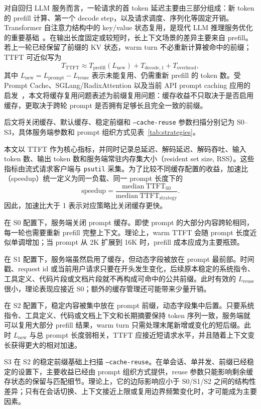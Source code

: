 \documentclass[10pt]{article}
\begin{document}
对自回归 LLM 服务而言，一轮请求的首 token 延迟主要由三部分组成：新 token 的 prefill 计算、第一个 decode step，以及请求调度、序列化等固定开销。Transformer 自注意力结构中的 key/value 状态复用，是现代 LLM 推理服务优化的重要基础~\cite{vaswani2017attention,kwon2023pagedattention}。在输出长度固定或较短时，长上下文场景的差异主要来自 prefill。若上一轮已经保留了前缀的 KV 状态，warm turn 不必重新计算被命中的前缀；TTFT 可近似写为
\[
  T_{\mathrm{TTFT}} \approx T_{\mathrm{prefill}}(L_{\mathrm{new}}) + T_{\mathrm{decode},1} + T_{\mathrm{overhead}},
\]
其中 \(L_{\mathrm{new}} = L_{\mathrm{prompt}} - L_{\mathrm{reuse}}\) 表示未能复用、仍需重新 prefill 的 token 数。受 Prompt Cache、SGLang/RadixAttention 以及当前 API prompt caching 应用的启发~\cite{gim2024promptcache,zheng2024sglang,openai2026promptcaching}，本文将缓存复用问题表述为前缀复用问题：缓存收益不只取决于是否启用缓存，更取决于跨轮 prompt 是否拥有足够长且完全一致的前缀。

后文将关闭缓存、默认缓存、稳定前缀和 \texttt{--cache-reuse} 参数扫描分别记为 S0--S3，具体服务端参数和 prompt 组织方式见表~\ref{tab:strategies}。

本文以 TTFT 作为核心指标，并同时记录总延迟、解码延迟、解码吞吐、输入 token 数、输出 token 数和服务端常驻内存集大小（resident set size, RSS）。这些指标由流式请求客户端与 \texttt{psutil} 采集。为了比较不同缓存配置的收益，加速比（speedup）统一定义为同一负载、同一 prompt 长度下的
\[
  \mathrm{speedup} = \frac{\mathrm{median\ TTFT}_{\mathrm{S0}}}{\mathrm{median\ TTFT}_{\mathrm{strategy}}}.
\]
因此，加速比大于 1 表示对应策略比关闭缓存更快。

在 S0 配置下，服务端关闭 prompt 缓存。即使 prompt 的大部分内容跨轮相同，每一轮也需要重新 prefill 完整上下文。理论上，warm TTFT 会随 prompt 长度近似单调增加；当 prompt 从 2K 扩展到 16K 时，prefill 成本应成为主要瓶颈。

在 S1 配置下，服务端虽然启用了缓存，但动态字段被放在 prompt 最前部。时间戳、request id 或当前用户请求只要在开头发生变化，后续原本稳定的系统指令、工具定义、代码片段或文档片段就不再构成可命中的公共前缀。此时有效的 \(L_{\mathrm{reuse}}\) 很小，理论表现应接近 S0；额外的缓存管理还可能带来少量开销。

在 S2 配置下，稳定内容被集中放在 prompt 前缀，动态字段集中后置。只要系统指令、工具定义、代码或文档上下文和长期摘要保持 token 序列一致，服务端就可以复用大部分 prefill 结果，warm turn 只需处理末尾新增或变化的短后缀。此时 \(L_{\mathrm{new}}\) 与总 prompt 长度弱相关，TTFT 应接近短请求水平，并且随着上下文变长获得更大的相对加速。

S3 在 S2 的稳定前缀基础上扫描 \texttt{--cache-reuse}。在单会话、单并发、前缀已经稳定的设置下，主要收益已经由 prompt 组织方式提供，reuse 参数只能影响剩余缓存状态的保留与匹配细节。理论上，它的边际影响应小于 S0/S1/S2 之间的结构性差异；只有在会话切换、上下文接近上限或复用边界频繁变化时，才可能成为主要因素。
\end{document}

